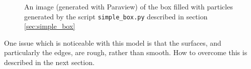 \begin{figure}
\begin{center}
\end{center}
\caption{An image (generated with Paraview) of the box filled with particles generated by the script \texttt{simple\_box.py} described in section \ref{sec:simple_box} } \label{fig:simple_box}
\end{figure}
One issue which is noticeable with this model is that the surfaces, and particularly the edges, are rough, rather than smooth. How to overcome this is described in the next section.

